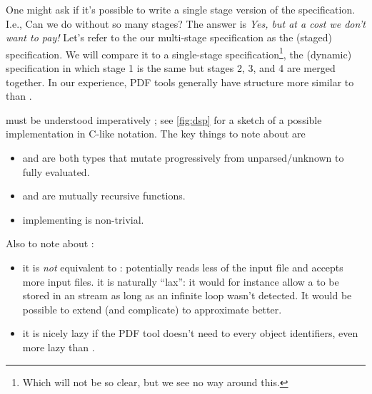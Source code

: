 One might ask if it's possible to write a single stage version of the
specification.  I.e., Can we do without so many stages?
The answer is \emph{Yes, but at a cost we don't want to pay!}
Let's refer to the our multi-stage specification as the \ssp{}
(staged) specification.
%
We will compare it to a single-stage specification\footnote{
  Which will not be so clear, but we see no way around this.
}, the \dsp{}
(dynamic) specification in which stage 1 is the same
but stages 2, 3, and 4 are
merged together.
%
In our experience, PDF tools generally have structure more similar to \dsp{} than \ssp{}.

\dsp{} must be understood imperatively ;
%
see \cref{fig:dsp} for a sketch
of a possible implementation in C-like notation.
The key things to note about \dsp{} are
\begin{itemize}
\item {} and  are both types that mutate progressively
   from unparsed/unknown to fully evaluated.
\item {} and  are mutually recursive functions.
\item implementing  is non-trivial.
\end{itemize}
Also to note about \dsp{}:
\begin{itemize}
\item it is \emph{not} equivalent to \ssp{}: \dsp{} potentially reads
  less of the input file and accepts more input files.  it is
  naturally ``lax'': it would for instance allow a  to
  be stored in an  stream as long as an infinite loop
  wasn't detected.  It would be possible to extend (and complicate) \dsp{}
  to approximate \ssp{} better.
\item it is nicely lazy if the PDF tool doesn't need to 
  every object identifiers, even more lazy than \ssp{}.
\end{itemize}


